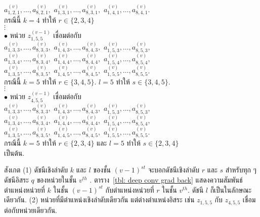 $a_{1,2,1}^{(v)}, \ldots, a_{8,2,1}^{(v)},$ 
$a_{1,3,1}^{(v)}, \ldots, a_{8,3,1}^{(v)},$
$a_{1,4,1}^{(v)}, \ldots, a_{8,4,1}^{(v)}$. \\
กรณีนี้ $k = 4$ ทำให้ $r \in \{2, 3, 4\}$ \\
%
$\vdots$ \\ %
%
$\bullet$\;\; หน่วย $z_{1,5,5}^{(v-1)}$ เชื่อมต่อกับ \\
$a_{1,3,3}^{(v)}, \ldots, a_{8,3,3}^{(v)},$ 
$a_{1,4,3}^{(v)}, \ldots, a_{8,4,3}^{(v)},$
$a_{1,5,3}^{(v)}, \ldots, a_{8,5,3}^{(v)},$ \\
$a_{1,3,4}^{(v)}, \ldots, a_{8,3,4}^{(v)},$ 
$a_{1,4,4}^{(v)}, \ldots, a_{8,4,4}^{(v)},$
$a_{1,5,4}^{(v)}, \ldots, a_{8,5,4}^{(v)},$ \\
$a_{1,3,5}^{(v)}, \ldots, a_{8,3,5}^{(v)},$ 
$a_{1,4,5}^{(v)}, \ldots, a_{8,4,5}^{(v)},$
$a_{1,5,5}^{(v)}, \ldots, a_{8,5,5}^{(v)}$.  
\\
\; กรณีนี้ $k = 5$ ทำให้ $r \in \{3, 4, 5\}$.
$l = 5$ ทำให้ $s \in \{3, 4, 5\}$. \\
%
$\vdots$ \\
%
$\bullet$\;\; หน่วย $z_{4,5,5}^{(v-1)}$ เชื่อมต่อกับ \\
$a_{1,3,3}^{(v)}, \ldots, a_{8,3,3}^{(v)},$ 
$a_{1,4,3}^{(v)}, \ldots, a_{8,4,3}^{(v)},$
$a_{1,5,3}^{(v)}, \ldots, a_{8,5,3}^{(v)},$ \\
$a_{1,3,4}^{(v)}, \ldots, a_{8,3,4}^{(v)},$ 
$a_{1,4,4}^{(v)}, \ldots, a_{8,4,4}^{(v)},$
$a_{1,5,4}^{(v)}, \ldots, a_{8,5,4}^{(v)},$ \\
$a_{1,3,5}^{(v)}, \ldots, a_{8,3,5}^{(v)},$ 
$a_{1,4,5}^{(v)}, \ldots, a_{8,4,5}^{(v)},$
$a_{1,5,5}^{(v)}, \ldots, a_{8,5,5}^{(v)}$.  
\\
\; กรณีนี้ $k = 5$ ทำให้ $r \in \{2, 3, 4\}$ 
และ $l = 5$ ทำให้ $s \in \{2, 3, 4\}$ 
\\
เป็นต้น.
%

สังเกต
(1) ดัชนีเชิงลำดับ $k$ และ $l$ ของชั้น $(v-1)^{st}$ จะบอกดัชนีเชิงลำดับ $r$ และ $s$ สำหรับทุก ๆ ดัชนีอิสระ $q$ ของหน่วยในชั้น $v^{th}$ .
ตาราง~\ref{tbl: deep conv grad back} แสดงความสัมพันธ์ตำแหน่งหน่วยที่ $k$ ในชั้น $(v-1)^{st}$ กับตำแหน่งหน่วยที่ $r$ ในชั้น $v^{th}$.
ดัชนี $l$ ก็เป็นในลักษณะเดียวกัน.
%
(2) หน่วยที่มีตำแหน่งเชิงลำดับเดียวกัน แต่ต่างตำแหน่งอิสระ เช่น $z_{1, 5, 5}$
กับ $z_{4, 5, 5}$ เชื่อมต่อกับหน่วยเดียวกัน.

